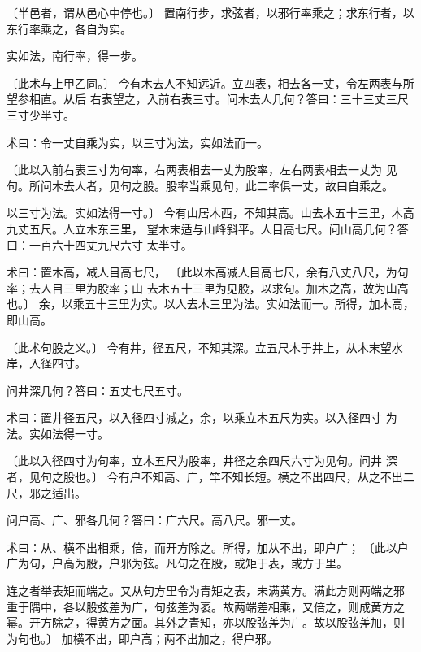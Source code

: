 \documentclass[a4paper,12pt,UTF8,twoside]{ctexbook}
\begin{document}
〔半邑者，谓从邑心中停也。〕 置南行步，求弦者，以邪行率乘之；求东行者，以东行率乘之，各自为实。

实如法，南行率，得一步。

〔此术与上甲乙同。〕 今有木去人不知远近。立四表，相去各一丈，令左两表与所望参相直。从后 右表望之，入前右表三寸。问木去人几何？答曰：三十三丈三尺三寸少半寸。

术曰：令一丈自乘为实，以三寸为法，实如法而一。

〔此以入前右表三寸为句率，右两表相去一丈为股率，左右两表相去一丈为 见句。所问木去人者，见句之股。股率当乘见句，此二率俱一丈，故曰自乘之。

以三寸为法。实如法得一寸。〕 今有山居木西，不知其高。山去木五十三里，木高九丈五尺。人立木东三里， 望木末适与山峰斜平。人目高七尺。问山高几何？答曰：一百六十四丈九尺六寸 太半寸。

术曰：置木高，减人目高七尺， 〔此以木高减人目高七尺，余有八丈八尺，为句率；去人目三里为股率；山 去木五十三里为见股，以求句。加木之高，故为山高也。〕 余，以乘五十三里为实。以人去木三里为法。实如法而一。所得，加木高， 即山高。

〔此术句股之义。〕 今有井，径五尺，不知其深。立五尺木于井上，从木末望水岸，入径四寸。

问井深几何？答曰：五丈七尺五寸。

术曰：置井径五尺，以入径四寸减之，余，以乘立木五尺为实。以入径四寸 为法。实如法得一寸。

〔此以入径四寸为句率，立木五尺为股率，井径之余四尺六寸为见句。问井 深者，见句之股也。〕 今有户不知高、广，竿不知长短。横之不出四尺，从之不出二尺，邪之适出。

问户高、广、邪各几何？答曰：广六尺。高八尺。邪一丈。

术曰：从、横不出相乘，倍，而开方除之。所得，加从不出，即户广； 〔此以户广为句，户高为股，户邪为弦。凡句之在股，或矩于表，或方于里。

连之者举表矩而端之。又从句方里令为青矩之表，未满黄方。满此方则两端之邪 重于隅中，各以股弦差为广，句弦差为袤。故两端差相乘，又倍之，则成黄方之 幂。开方除之，得黄方之面。其外之青知，亦以股弦差为广。故以股弦差加，则 为句也。〕 加横不出，即户高；两不出加之，得户邪。
\end{document}
